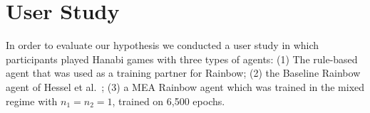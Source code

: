 \documentclass[letterpaper]{article} %
\begin{document}



\section{User Study}
In order to evaluate our hypothesis we conducted a user study in which participants played Hanabi games 
with three types of agents: (1) The rule-based agent that was used as a training partner for Rainbow; (2) the Baseline Rainbow agent of Hessel et al.~\cite{hessel2018rainbow}; (3) a MEA Rainbow agent which was trained in the mixed regime with $n_1=n_2=1$, trained on 6,500 epochs. 
    
    
    
    
\end{document}
